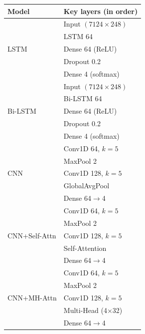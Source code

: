 \documentclass[conference]{IEEEtran}
\begin{document}
\begin{tabular}{ll}
    \toprule
    Model & Key layers (in order) \\
    \midrule
    \multirow{5}{*}{LSTM}            & Input $(7124{\times}248)$\\
                                     & LSTM 64\\
                                     & Dense 64 (ReLU)\\
                                     & Dropout 0.2\\
                                     & Dense 4 (softmax)\\
    \midrule
    \multirow{5}{*}{Bi-LSTM}         & Input $(7124{\times}248)$\\
                                     & Bi-LSTM 64\\
                                     & Dense 64 (ReLU)\\
                                     & Dropout 0.2\\
                                     & Dense 4 (softmax)\\
    \midrule
    \multirow{5}{*}{CNN}             & Conv1D 64, $k{=}5$\\
                                     & MaxPool 2\\
                                     & Conv1D 128, $k{=}5$\\
                                     & GlobalAvgPool\\
                                     & Dense 64$\rightarrow$4\\
    \midrule
    \multirow{5}{*}{CNN+Self-Attn}   & Conv1D 64, $k{=}5$\\
                                     & MaxPool 2\\
                                     & Conv1D 128, $k{=}5$\\
                                     & Self-Attention\\
                                     & Dense 64$\rightarrow$4\\
    \midrule
    \multirow{5}{*}{CNN+MH-Attn}     & Conv1D 64, $k{=}5$\\
                                     & MaxPool 2\\
                                     & Conv1D 128, $k{=}5$\\
                                     & Multi-Head (4$\times$32)\\
                                     & Dense 64$\rightarrow$4\\
    \bottomrule
    \end{tabular}
\end{document}
